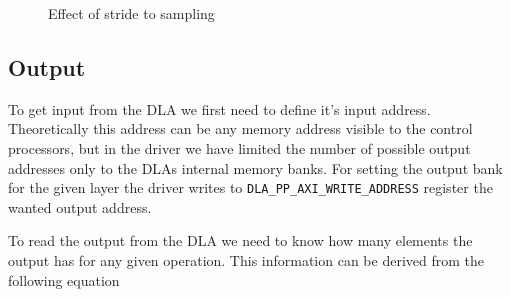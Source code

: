 \documentclass[12pt,a4paper,english
]{tunithesis}
\begin{document}
\begin{figure}
  \centering
{}
\caption{Effect of stride to sampling}
\label{fig:stride}
\end{figure}

\subsection{Output}
To get input from the DLA we first need to define it's input address. Theoretically this address can be any memory address visible to the control processors, but in the driver we have limited the number of possible output addresses only to the DLAs internal memory banks. For setting the output bank for the given layer the driver writes to \texttt{DLA\_PP\_AXI\_WRITE\_ADDRESS} register the wanted output address.

To read the output from the DLA we need to know how many elements the output has for any given operation. This information can be derived from the following equation
\end{document}
